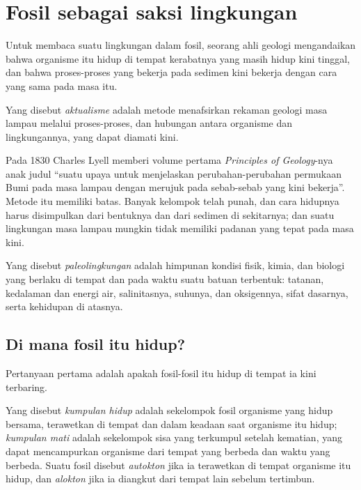 \section{Fosil sebagai saksi lingkungan}\label{sec:b2:palaeoenvironments:environment}

Untuk membaca suatu lingkungan dalam fosil, seorang ahli geologi mengandaikan bahwa organisme itu hidup di tempat kerabatnya yang
masih hidup kini tinggal, dan bahwa proses-proses yang bekerja pada sedimen kini bekerja dengan cara yang sama pada masa itu.

\begin{definition}[Aktualisme]\label{def:b2:palaeoenvironments:actualism}
Yang disebut \emph{aktualisme} adalah metode menafsirkan rekaman geologi masa lampau melalui
proses-proses, dan hubungan antara organisme dan lingkungannya, yang dapat diamati kini.
\end{definition}

Pada 1830 Charles Lyell memberi volume pertama \emph{Principles of Geology}-nya anak judul ``suatu
upaya untuk menjelaskan perubahan-perubahan permukaan Bumi pada masa lampau dengan merujuk pada sebab-sebab yang kini
bekerja''. Metode itu memiliki batas. Banyak kelompok telah punah, dan cara hidupnya harus
disimpulkan dari bentuknya dan dari sedimen di sekitarnya; dan suatu lingkungan masa lampau mungkin
tidak memiliki padanan yang tepat pada masa kini.

\begin{definition}[Paleolingkungan]\label{def:b2:palaeoenvironments:palaeoenvironment}
Yang disebut \emph{paleolingkungan} adalah himpunan kondisi fisik, kimia, dan
biologi yang berlaku di tempat dan pada waktu suatu batuan terbentuk: tatanan, kedalaman dan
energi air, salinitasnya, suhunya, dan oksigennya, sifat dasarnya, serta kehidupan
di atasnya.
\end{definition}

\subsection*{Di mana fosil itu hidup?}

Pertanyaan pertama adalah apakah fosil-fosil itu hidup di tempat ia kini terbaring.

\begin{definition}\label{def:b2:palaeoenvironments:assemblages}
Yang disebut \emph{kumpulan hidup} adalah sekelompok fosil organisme yang hidup
bersama, terawetkan di tempat dan dalam keadaan saat organisme itu hidup; \emph{kumpulan mati} adalah
sekelompok sisa yang terkumpul setelah kematian, yang dapat mencampurkan organisme dari tempat yang berbeda
dan waktu yang berbeda. Suatu fosil disebut \emph{autokton} jika ia
terawetkan di tempat organisme itu hidup, dan \emph{alokton} jika ia
diangkut dari tempat lain sebelum tertimbun.
\end{definition}

